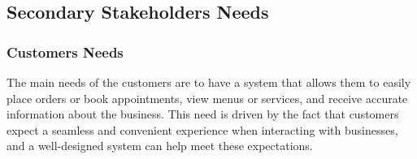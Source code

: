 \documentclass[]{VUMIFTemplateClass}
\begin{document}

\subsection{Secondary Stakeholders Needs}

\subsubsection{Customers Needs}

The main needs of the customers are to have a system that allows them to
easily place orders or book appointments, view menus or services, and receive
accurate information about the business. This need is driven by the fact that
customers expect a seamless and convenient experience when interacting with
businesses, and a well-designed system can help meet these expectations.


\end{document}
